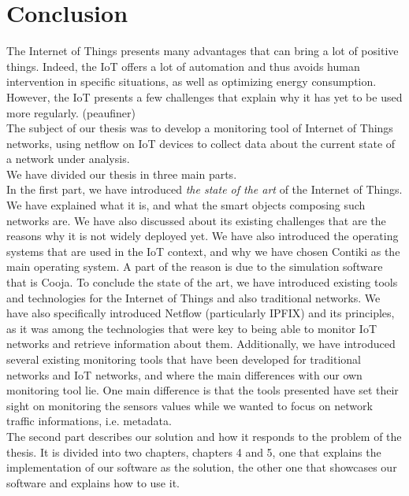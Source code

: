\chapter*{Conclusion}

The Internet of Things presents many advantages that can bring a lot of positive things. Indeed, the IoT offers a lot of automation and thus avoids human intervention in specific situations, as well as optimizing energy consumption. However, the IoT presents a few challenges that explain why it has yet to be used more regularly. (peaufiner)\\

The subject of our thesis was to develop a monitoring tool of Internet of Things networks, using netflow on IoT devices to collect data about the current state of a network under analysis.\\

We have divided our thesis in three main parts.\\

In the first part, we have introduced \textit{the state of the art} of the Internet of Things. We have explained what it is, and what the smart objects composing such networks are. We have also discussed about its existing challenges that are the reasons why it is not widely deployed yet. We have also introduced the operating systems that are used in the IoT context, and why we have chosen Contiki as the main operating system. A part of the reason is due to the simulation software that is Cooja. To conclude the state of the art, we have introduced existing tools and technologies for the Internet of Things and also traditional networks. We have also specifically introduced Netflow (particularly IPFIX) and its principles, as it was among the technologies that were key to being able to monitor IoT networks and retrieve information about them. Additionally, we have introduced several existing monitoring tools that have been developed for traditional networks and IoT networks, and where the main differences with our own monitoring tool lie. One main difference is that the tools presented have set their sight on monitoring the sensors values while we wanted to focus on network traffic informations, i.e. metadata.\\

The second part describes our solution and how it responds to the problem of the thesis. It is divided into two chapters, chapters 4 and 5, one that explains the implementation of our software as the solution, the other one that showcases our software and explains how to use it.\\

